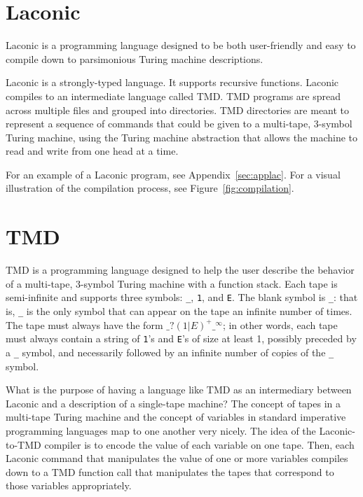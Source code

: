 \documentclass[11pt]{article}
\begin{document}
\section{Laconic}

Laconic is a programming language designed to be both user-friendly and easy to compile down to parsimonious Turing machine descriptions. 

Laconic is a strongly-typed language. It supports recursive functions. Laconic compiles to an intermediate language called TMD. TMD programs are spread across multiple files and grouped into directories. TMD directories are meant to represent a sequence of commands that could be given to a multi-tape, 3-symbol Turing machine, using the Turing machine abstraction that allows the machine to read and write from one head at a time. 

For an example of a Laconic program, see Appendix~\ref{sec:applac}. For a visual illustration of the compilation process, see Figure~\ref{fig:compilation}.

\section{TMD}

TMD is a programming language designed to help the user describe the behavior of a multi-tape, 3-symbol Turing machine with a function stack. Each tape is semi-infinite and supports three symbols: \texttt{\_}, \texttt{1}, and \texttt{E}. The blank symbol is \texttt{\_}: that is, \texttt{\_} is the only symbol that can appear on the tape an infinite number of times. The tape must always have the form $\texttt{\_}?(1|E)^+\texttt{\_}^{\infty}$; in other words, each tape must always contain a string of \texttt{1}'s and \texttt{E}'s of size at least 1, possibly preceded by a \texttt{\_} symbol, and necessarily followed by an infinite number of copies of the \texttt{\_} symbol. 

What is the purpose of having a language like TMD as an intermediary between Laconic and a description of a single-tape machine? The concept of tapes in a multi-tape Turing machine and the concept of variables in standard imperative programming languages map to one another very nicely. The idea of the Laconic-to-TMD compiler is to encode the value of each variable on one tape. Then, each Laconic command that manipulates the value of one or more variables compiles down to a TMD function call that manipulates the tapes that correspond to those variables appropriately. 
\end{document}
